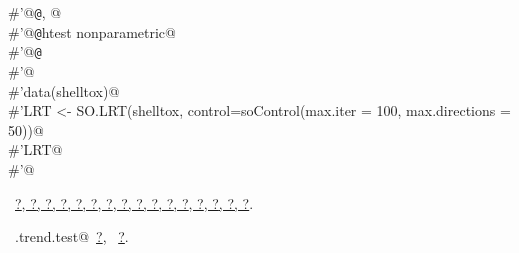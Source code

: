 \documentclass[reqno]{amsart}
\renewcommand{\NWlink}[2]{\hyperlink{#1}{#2}}
\begin{document}
\begin{flushleft}
\begin{list}{}{}
\mbox{}\verb@#'@{\tt @}\verb@seealso {}, @\\
\mbox{}\verb@#'@{\tt @}\verb@keywords htest nonparametric@\\
\mbox{}\verb@#'@{\tt @}\verb@examples@\\
\mbox{}\verb@#'@\\
\mbox{}\verb@#'data(shelltox)@\\
\mbox{}\verb@#'LRT <- SO.LRT(shelltox, control=soControl(max.iter = 100, max.directions = 50))@\\
\mbox{}\verb@#'LRT@\\
\mbox{}\verb@#'@\\
\mbox{}\verb@@{\NWsep}
\end{list}
\vspace{-1.5ex}
\footnotesize
\begin{list}{}{\setlength{\itemsep}{-\parsep}\setlength{\itemindent}{-\leftmargin}}
\item \NWtxtFileDefBy\ \NWlink{nuweb?}{?}\NWlink{nuweb?}{, ?}\NWlink{nuweb?}{, ?}\NWlink{nuweb?}{, ?}\NWlink{nuweb?}{, ?}\NWlink{nuweb?}{, ?}\NWlink{nuweb?}{, ?}\NWlink{nuweb?}{, ?}\NWlink{nuweb?}{, ?}\NWlink{nuweb?}{, ?}\NWlink{nuweb?}{, ?}\NWlink{nuweb?}{, ?}\NWlink{nuweb?}{, ?}\NWlink{nuweb?}{, ?}\NWlink{nuweb?}{, ?}\NWlink{nuweb?}{, ?}.
\item \NWtxtIdentsUsed\nobreak\  \verb@SO.trend.test@\nobreak\ \NWlink{nuweb?}{?}, \verb@soControl@\nobreak\ \NWlink{nuweb?}{?}.
\item{}
\end{list}
\vspace{4ex}
\end{flushleft}
\end{document}
